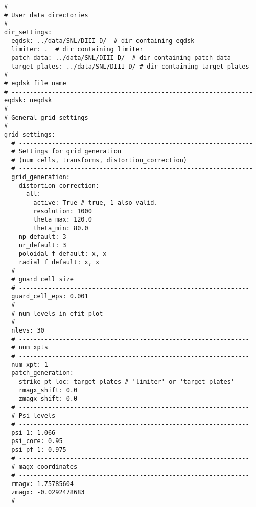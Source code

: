 \begin{lstlisting}[basicstyle=\small, aboveskip=\bigskipamount, frame=single, captionpos=b, caption={Snippet of YAML formatted configuration file. YAML files utilize Python formatted comments, keyword-value mappings, and nesting of structures via indentation.}]
# ------------------------------------------------------------------
# User data directories
# ------------------------------------------------------------------
dir_settings:
  eqdsk: ../data/SNL/DIII-D/  # dir containing eqdsk
  limiter: .  # dir containing limiter
  patch_data: ../data/SNL/DIII-D/  # dir containing patch data
  target_plates: ../data/SNL/DIII-D/ # dir containing target plates
# ------------------------------------------------------------------
# eqdsk file name
# ------------------------------------------------------------------
eqdsk: neqdsk
# ------------------------------------------------------------------
# General grid settings
# ------------------------------------------------------------------
grid_settings:
  # ----------------------------------------------------------------
  # Settings for grid generation 
  # (num cells, transforms, distortion_correction)
  # ----------------------------------------------------------------
  grid_generation:
    distortion_correction:
      all:
        active: True # true, 1 also valid.
        resolution: 1000
        theta_max: 120.0
        theta_min: 80.0
    np_default: 3
    nr_default: 3
    poloidal_f_default: x, x
    radial_f_default: x, x
  # ---------------------------------------------------------------
  # guard cell size
  # ---------------------------------------------------------------
  guard_cell_eps: 0.001
  # ---------------------------------------------------------------
  # num levels in efit plot
  # ---------------------------------------------------------------
  nlevs: 30
  # ---------------------------------------------------------------
  # num xpts
  # ---------------------------------------------------------------
  num_xpt: 1
  patch_generation:
    strike_pt_loc: target_plates # 'limiter' or 'target_plates'
    rmagx_shift: 0.0
    zmagx_shift: 0.0
  # ---------------------------------------------------------------
  # Psi levels
  # ---------------------------------------------------------------
  psi_1: 1.066
  psi_core: 0.95
  psi_pf_1: 0.975
  # ---------------------------------------------------------------
  # magx coordinates
  # ---------------------------------------------------------------
  rmagx: 1.75785604
  zmagx: -0.0292478683
  # ---------------------------------------------------------------

\end{lstlisting}
